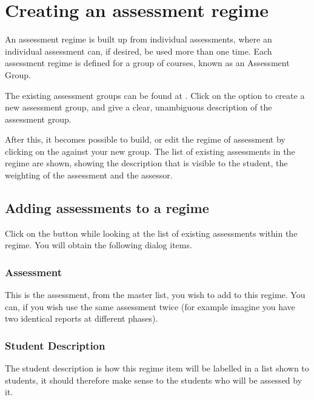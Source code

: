 \documentclass[12 pt]{book}
\begin{document}
\section{Creating an assessment regime}

An assessment regime is built up from individual assessments, where an
individual assessment can, if desired, be used more than one time. Each
assessment regime is defined for a group of courses, known as an 
Assessment Group.

The existing assessment groups can be found at
. Click on the
 option to create a new assessment group, and
give a clear, unambiguous description of the assessment group.

After this, it becomes possible to build, or edit the regime of assessment
by clicking on the  against your new group. The list
of existing assessments in the regime are shown, showing the description
that is visible to the student, the weighting of the assessment and the
assessor.


\subsection{Adding assessments to a regime}

Click on the  button while looking at the list of
existing assessments within the regime. You will obtain the following
dialog items.

\subsubsection{Assessment}

This is the assessment, from the master list, you wish to add to this 
regime. You can, if you wish use the same assessment twice (for example
imagine you have two identical reports at different phases).

\subsubsection{Student Description}

The student description is how this regime item will be labelled in a
list shown to students, it should therefore make sense to the students
who will be assessed by it.
\end{document}
